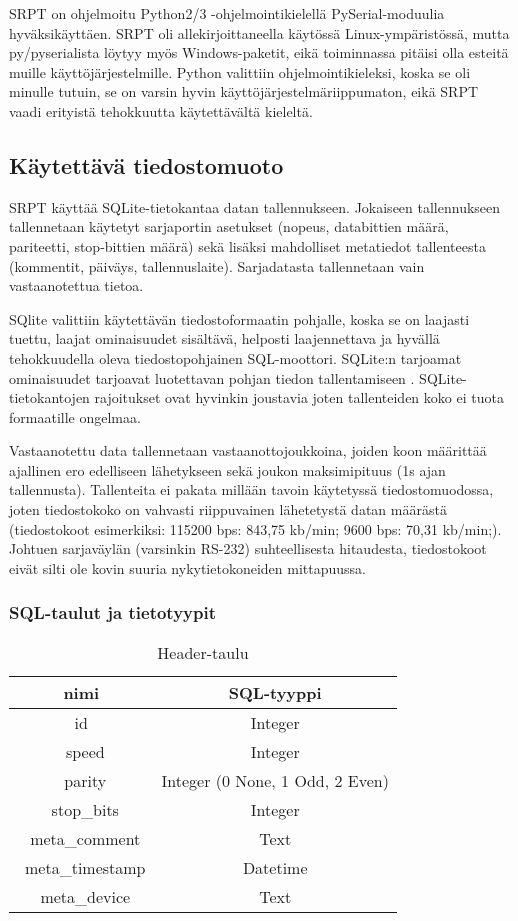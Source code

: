 SRPT on ohjelmoitu Python2/3 -ohjelmointikielellä PySerial-moduulia hyväksikäyttäen. SRPT oli allekirjoittaneella käytössä Linux-ympäristössä, mutta py/pyserialista löytyy myös Windows-paketit, eikä toiminnassa pitäisi olla esteitä muille käyttöjärjestelmille. Python valittiin ohjelmointikieleksi, koska se oli minulle tutuin, se on varsin hyvin käyttöjärjestelmäriippumaton, eikä SRPT vaadi erityistä tehokkuutta käytettävältä kieleltä.

\subsection{Käytettävä tiedostomuoto}
SRPT käyttää SQLite-tietokantaa datan tallennukseen. Jokaiseen tallennukseen tallennetaan käytetyt sarjaportin asetukset (nopeus, databittien määrä, pariteetti, stop-bittien määrä) sekä lisäksi mahdolliset metatiedot tallenteesta (kommentit, päiväys, tallennuslaite). Sarjadatasta tallennetaan vain vastaanotettua tietoa.

SQlite valittiin käytettävän tiedostoformaatin pohjalle, koska se on laajasti tuettu, laajat ominaisuudet sisältävä, helposti laajennettava ja hyvällä tehokkuudella oleva tiedostopohjainen SQL-moottori. SQLite:n tarjoamat ominaisuudet tarjoavat luotettavan pohjan tiedon tallentamiseen \cite{sqlite:appfileformat}. SQLite-tietokantojen rajoitukset ovat hyvinkin joustavia joten tallenteiden koko ei tuota formaatille ongelmaa.

Vastaanotettu data tallennetaan vastaanottojoukkoina, joiden koon määrittää ajallinen ero edelliseen lähetykseen sekä joukon maksimipituus (1s ajan tallennusta). Tallenteita ei pakata millään tavoin käytetyssä tiedostomuodossa, joten tiedostokoko on vahvasti riippuvainen lähetetystä datan määrästä (tiedostokoot esimerkiksi: 115200 bps: 843,75 kb/min; 9600 bps: 70,31 kb/min;). Johtuen sarjaväylän (varsinkin RS-232) suhteellisesta hitaudesta, tiedostokoot eivät silti ole kovin suuria nykytietokoneiden mittapuussa.


\subsubsection{SQL-taulut ja tietotyypit}

\begin{table}[h]
\centering
\caption{Header-taulu}
\begin{tabular}{ c|c }
\centering
nimi & SQL-tyyppi \\\toprule
id & Integer \\\
speed & Integer \\\
parity & Integer (0 None, 1 Odd, 2 Even) \\\
stop\_bits & Integer \\\
meta\_comment & Text \\\
meta\_timestamp & Datetime \\\
meta\_device & Text \\\bottomrule
\end{tabular}
\end{table}

